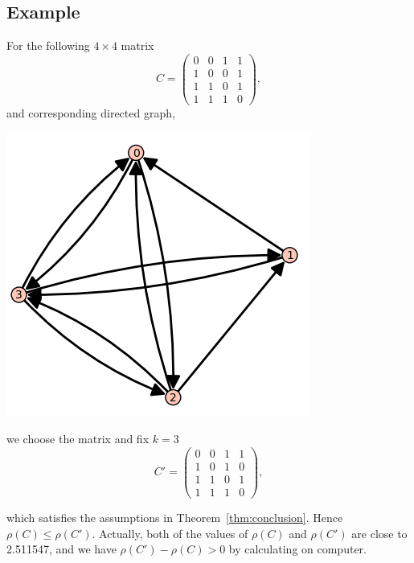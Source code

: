 \documentclass[12pt, a4paper]{article}
\theoremstyle{plain}
\theoremstyle{definition}
\begin{document}
\subsection{Example}
    For the following $4\times 4$ matrix
    $$C=\begin{pmatrix}
    0 & 0 & 1 & 1\\
    1 & 0 & 0 & 1\\
    1 & 1 & 0 & 1\\
    1 & 1 & 1 & 0
    \end{pmatrix},$$
    and corresponding directed graph, \cite[sage]{sage}
    \begin{center}
    \includegraphics{graph_C.PNG}
    \end{center}
    we choose the matrix and fix $k = 3$
    $$C'=\begin{pmatrix}
    0 & 0 & 1 & 1\\
    1 & 0 & 1 & 0\\
    1 & 1 & 0 & 1\\
    1 & 1 & 1 & 0
    \end{pmatrix},$$

    which satisfies the assumptions in Theorem~\ref{thm:conclusion}. Hence $\rho(C)\leq\rho(C')$.
     Actually, both of the values of $\rho(C)$ and $\rho(C')$ are close to 2.511547, and we have
      $\rho(C')-\rho(C)>0$ by calculating on computer.
\end{document}
